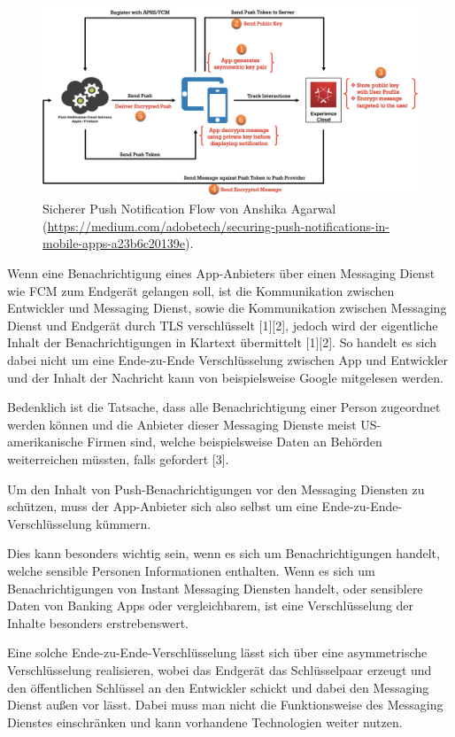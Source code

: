 \documentclass[sigconf]{acmart}
\begin{document}
\begin{figure}[h]
  \centering
  \includegraphics[width=\linewidth]{sample-secureflow}
  \caption{Sicherer Push Notification Flow von Anshika Agarwal (\url{https://medium.com/adobetech/securing-push-notifications-in-mobile-apps-a23b6c20139e}).}
\end{figure}

Wenn eine Benachrichtigung eines App-Anbieters über einen Messaging 
Dienst wie FCM zum Endgerät gelangen soll, ist die Kommunikation 
zwischen Entwickler und Messaging Dienst, sowie die Kommunikation 
zwischen Messaging Dienst und Endgerät durch TLS verschlüsselt [1][2], 
jedoch wird der eigentliche Inhalt der Benachrichtigungen in Klartext 
übermittelt [1][2]. So handelt es sich dabei nicht um eine 
Ende-zu-Ende Verschlüsselung zwischen App und Entwickler und der Inhalt der Nachricht kann von 
beispielsweise Google mitgelesen werden.

Bedenklich ist die Tatsache, dass alle Benachrichtigung 
einer Person zugeordnet werden können und die Anbieter dieser Messaging 
Dienste meist US-amerikanische Firmen sind, welche beispielsweise 
Daten an Behörden weiterreichen müssten, falls gefordert [3].

Um den Inhalt von Push-Benachrichtigungen vor den Messaging Diensten 
zu schützen, muss der App-Anbieter sich also selbst um eine 
Ende-zu-Ende-Verschlüsselung kümmern.

Dies kann besonders wichtig sein, wenn es sich um Benachrichtigungen 
handelt, welche sensible Personen Informationen enthalten. Wenn es 
sich um Benachrichtigungen von Instant Messaging Diensten handelt, 
oder sensiblere Daten von Banking Apps oder vergleichbarem, 
ist eine Verschlüsselung der Inhalte besonders erstrebenswert.

Eine solche Ende-zu-Ende-Verschlüsselung lässt sich über eine 
asymmetrische Verschlüsselung realisieren, wobei das 
Endgerät das Schlüsselpaar erzeugt und den öffentlichen Schlüssel an 
den Entwickler schickt und dabei den Messaging Dienst außen vor lässt. 
Dabei muss man nicht die Funktionsweise des Messaging Dienstes 
einschränken und kann vorhandene Technologien weiter nutzen.
\end{document}
